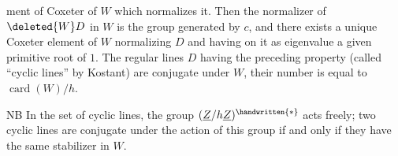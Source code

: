 ment of Coxeter of $W$ which normalizes it. Then the normalizer of $\deleted{W}D$ in $W$ is the group generated by $c$, and there exists a unique Coxeter element of $W$ normalizing $D$ and having on it as eigenvalue a given primitive  root of $1$. The regular lines $D$ having the preceding property (called ``cyclic lines'' by Kostant) are conjugate under $W$, their number is equal to $\operatorname{card}(W)/h$.

NB In the set of cyclic lines, the group $(\underline{Z}/h\underline{Z})^{\handwritten{*}}$ acts freely; two cyclic lines are conjugate under the action of this group if and only if they have the same stabilizer in $W$.
